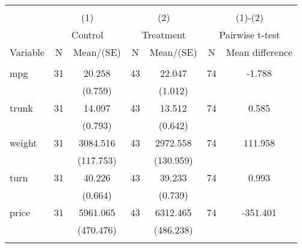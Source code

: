 
\begin{tabular}{@{\extracolsep{5pt}}lcccccc}
\\[-1.8ex]\hline \hline \\[-1.8ex]
 & \multicolumn{2}{c}{(1)}  & \multicolumn{2}{c}{(2)}  & \multicolumn{2}{c}{(1)-(2)} \\
 & \multicolumn{2}{c}{Control}  & \multicolumn{2}{c}{Treatment}  & \multicolumn{2}{c}{Pairwise t-test}  \\
Variable & N & Mean/(SE) & N & Mean/(SE) & N & Mean difference \\ \hline \\[-1.8ex] 
mpg   & 31    & 20.258    & 43    & 22.047    & 74    & -1.788   \\
 &   & (0.759)  &   & (1.012)  &   &  \\ [1ex]
trunk   & 31    & 14.097    & 43    & 13.512    & 74    & 0.585   \\
 &   & (0.793)  &   & (0.642)  &   &  \\ [1ex]
weight   & 31    & 3084.516    & 43    & 2972.558    & 74    & 111.958   \\
 &   & (117.753)  &   & (130.959)  &   &  \\ [1ex]
turn   & 31    & 40.226    & 43    & 39.233    & 74    & 0.993   \\
 &   & (0.664)  &   & (0.739)  &   &  \\ [1ex]
price   & 31    & 5961.065    & 43    & 6312.465    & 74    & -351.401   \\
 &   & (470.476)  &   & (486.238)  &   &  \\ [1ex]
\hline \hline \\[-1.8ex]

\end{tabular}
